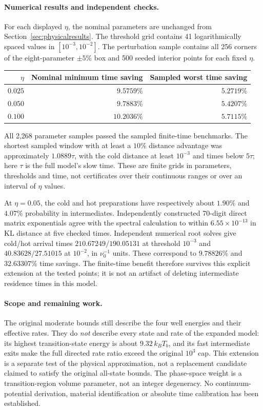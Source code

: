 \documentclass[11pt]{article}
\begin{document}
\paragraph{Numerical results and independent checks.}
For each displayed $\eta$, the nominal parameters are unchanged from
Section~\ref{sec:physicalresults}. The threshold grid contains 41
logarithmically spaced values in $[10^{-3},10^{-2}]$. The perturbation
sample contains all 256 corners of the eight-parameter $\pm5\%$ box
and 500 seeded interior points for each fixed $\eta$.
\begin{center}
\begin{tabular}{rrr}
\toprule
$\eta$ & Nominal minimum time saving & Sampled worst time saving\\
\midrule
$0.025$ & $9.5759\%$ & $5.2719\%$\\
$0.050$ & $9.7883\%$ & $5.4207\%$\\
$0.100$ & $10.2036\%$ & $5.7115\%$\\
\bottomrule
\end{tabular}
\end{center}
All 2,268 parameter samples passed the sampled finite-time benchmarks.
The shortest sampled window with at least a $10\%$ distance advantage
was approximately $1.0889\tau$, with the cold distance at least $10^{-3}$
and times below $5\tau$; here $\tau$ is the full model's slow time.
These are finite grids in parameters, thresholds and time, not certificates
over their continuous ranges or over an interval of $\eta$ values.

At $\eta=0.05$, the cold and hot preparations have respectively about
$1.90\%$ and $4.07\%$ probability in intermediates. Independently
constructed 70-digit direct matrix exponentials agree with the spectral
calculation to within $6.55\times10^{-13}$ in KL distance at five checked
times. Independent numerical root solves give cold/hot arrival times
$210.67249/190.05131$ at threshold $10^{-3}$ and
$40.83628/27.51015$ at $10^{-2}$, in $\nu_0^{-1}$ units.
These correspond to $9.78826\%$ and $32.63307\%$ time savings.
The finite-time benefit therefore survives this explicit extension at
the tested points; it is not an artifact of deleting intermediate
residence times in this model.

\paragraph{Scope and remaining work.}
The original moderate bounds still describe the four well energies and
their effective rates. They do \emph{not} describe every state and rate
of the expanded model: its highest transition-state energy is about
$9.32\,k_BT_b$, and its fast intermediate exits make the full directed
rate ratio exceed the original $10^3$ cap. This extension is a separate
test of the physical approximation, not a replacement candidate claimed
to satisfy the original all-state bounds. The phase-space weight is a
transition-region volume parameter, not an integer degeneracy.
No continuum-potential derivation, material identification or absolute
time calibration has been established.
\end{document}
